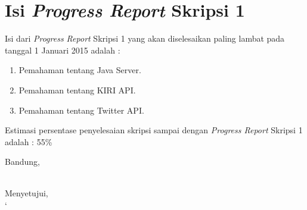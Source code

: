 \documentclass[a4paper,twoside]{article}
\begin{document}
\section{Isi {\it Progress Report} Skripsi 1}
Isi dari {\it Progress Report} Skripsi 1 yang akan diselesaikan paling lambat pada tanggal 1 Januari 2015 adalah :
\begin{enumerate}
	\item Pemahaman tentang Java Server.
	\item Pemahaman tentang KIRI API.
	\item Pemahaman tentang Twitter API.
\end{enumerate}
Estimasi persentase penyelesaian skripsi sampai dengan {\it Progress Report} Skripsi 1 adalah : 55\%
\vspace{1.5cm}

\centering Bandung, \tanggal\\
\vspace{2cm} \nama \\ 
\vspace{1cm}

Menyetujui, \\
`
\end{document}
